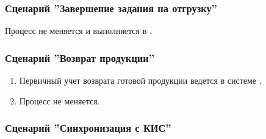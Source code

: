 \subsubsection{Сценарий ''Завершение задания на отгрузку''}
\label{bp:goods_5}

Процесс не меняется и выполняется в \erp.








\subsubsection{Сценарий ''Возврат продукции''}
\label{bp:goods_6}

\begin{enumerate}

\item Первичный учет возврата готовой продукции ведется в системе \erp. 
\item Процесс не меняется.

\end{enumerate}


\subsubsection{Сценарий ''Синхронизация с КИС''}
\label{bp:goods_exchange}



